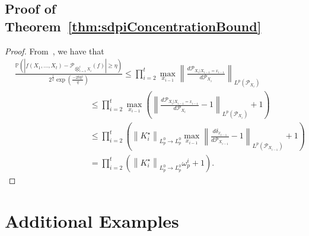 \documentclass[11pt]{article}
\newcommand{\Pm}{\mathcal{P}}
\theoremstyle{plain}
\theoremstyle{remark}
\begin{document}
\subsection{Proof of Theorem~\ref{thm:sdpiConcentrationBound}}
\begin{proof}
    \label{app:proofConcentrationWithoutIndependence}
    From~\cite[Theorem 1]{esposito2024concentration}, we have that 
\begin{align} &\frac{\mathbb{P}\left(\left\lvert f(X_1,\ldots,X_t)-\Pm_{\bigotimes_{i=1}^t X_i}(f)\right\rvert \geq \eta \right)}{2^{\frac1q} \exp\left(\frac{-2t\eta^2}{q }\right)} \leq \prod_{i=2}^t \max_{x_{i-1}} \left\lVert \frac{d\Pm_{X_i|X_{i-1}=x_{i-1}}}{d\Pm_{X_i}}\right\rVert_{L^p(\Pm_{X_i})}\\
    &\hspace{9em}\leq \prod_{i=2}^t \max_{x_{i-1}} \left(\left\lVert \frac{d\Pm_{X_i|X_{i-1}=x_{i-1}}}{d\Pm_{X_i}}-1\right\rVert_{L^p(\Pm_{X_i})}+1\right) \\
    &\hspace{9em}\leq \prod_{i=2}^t \left(\left\lVert K_i^\star \right\rVert_{L_p^0\to L_p^0}\max_{x_{i-1}} \left\lVert \frac{d\delta_{x_{i-1}}}{d\Pm_{X_{i-1}}}-1\right\rVert_{L^p(\Pm_{X_{i-1}})}+1\right) \\
    &\hspace{9em}= \prod_{i=2}^t \left(\left\lVert K_i^\star \right\rVert_{L_p^0\to L_p^0}\omega_p^i+1\right).\label{eq:boundConcentrationViaNorms}
\end{align}
\end{proof}
\iffalse 
\section{Additional Examples}
\end{document}
